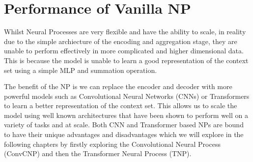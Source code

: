 \documentclass[../../main.tex]{subfiles}
\begin{document}







\section{Performance of Vanilla NP}

Whilst Neural Processes are very flexible and have the ability to scale, in reality due to the simple archiecture of the encoding and aggregation stage, they are unable to perform effectively in more complicated and higher dimensional data. This is because the model is unable to learn a good representation of the context set using a simple MLP and summation operation. 

The benefit of the NP is we can replace the encoder and decoder with more powerful models such as Convolutional Neural Networks (CNNs) or Transformers to learn a better representation of the context set. This allows us to scale the model using well known architectures that have been shown to perform well on a variety of tasks and at scale. Both CNN and Transformer based NPs are bound to have their unique advantages and disadvantages which we will explore in the following chapters by firstly exploring the Convolutional Neural Process (ConvCNP) and then the Transformer Neural Process (TNP).

\end{document}

